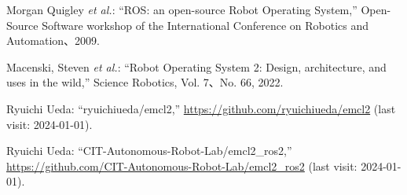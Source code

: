 \documentclass[twocolumn,9pt]{jsproceedings}
\begin{document}
\footnotesize
\begin{thebibliography}{99}
  Morgan Quigley {\it et al.}: ``ROS: an open-source Robot Operating System,''
  Open-Source Software workshop of the International Conference on Robotics and Automation、2009.

  Macenski, Steven {\it et al.}: ``Robot Operating System 2: Design, architecture, and uses in the wild,''
  Science Robotics, Vol. 7、No. 66, 2022.










  Ryuichi Ueda: ``ryuichiueda/emcl2,'' \url{https://github.com/ryuichiueda/emcl2} (last visit: 2024-01-01).

  Ryuichi Ueda: ``CIT-Autonomous-Robot-Lab/emcl2\_ros2,'' \url{https://github.com/CIT-Autonomous-Robot-Lab/emcl2_ros2} (last visit: 2024-01-01).


\end{thebibliography}
\end{document}
